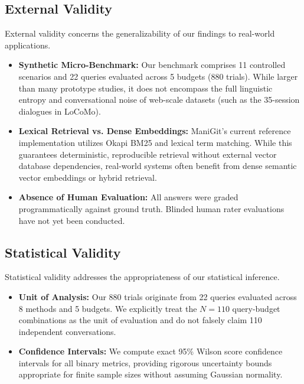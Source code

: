 \subsection{External Validity}
External validity concerns the generalizability of our findings to real-world applications.
\begin{itemize}
    \item \textbf{Synthetic Micro-Benchmark:} Our benchmark comprises 11 controlled scenarios and 22 queries evaluated across 5 budgets (880 trials). While larger than many prototype studies, it does not encompass the full linguistic entropy and conversational noise of web-scale datasets (such as the 35-session dialogues in LoCoMo).
    \item \textbf{Lexical Retrieval vs. Dense Embeddings:} ManiGit's current reference implementation utilizes Okapi BM25 and lexical term matching. While this guarantees deterministic, reproducible retrieval without external vector database dependencies, real-world systems often benefit from dense semantic vector embeddings or hybrid retrieval.
    \item \textbf{Absence of Human Evaluation:} All answers were graded programmatically against ground truth. Blinded human rater evaluations have not yet been conducted.
\end{itemize}

\subsection{Statistical Validity}
Statistical validity addresses the appropriateness of our statistical inference.
\begin{itemize}
    \item \textbf{Unit of Analysis:} Our 880 trials originate from 22 queries evaluated across 8 methods and 5 budgets. We explicitly treat the $N=110$ query-budget combinations as the unit of evaluation and do not falsely claim 110 independent conversations.
    \item \textbf{Confidence Intervals:} We compute exact 95\% Wilson score confidence intervals for all binary metrics, providing rigorous uncertainty bounds appropriate for finite sample sizes without assuming Gaussian normality.
\end{itemize}

